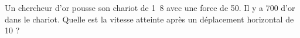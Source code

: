 

\begin{exercice}\label{exo024}\label{exo:chariotor}
Un chercheur d'or pousse son chariot de \unit{1.8}{\kilogram} avec une force de \unit{50}{\newton}. Il y a \unit{700}{\gram} d'or dans le chariot. Quelle est la vitesse atteinte après un déplacement horizontal de \unit{10}{\meter} ? 

\end{exercice}
